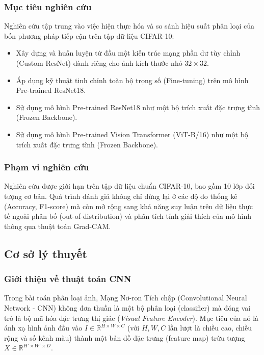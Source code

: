 \documentclass[a4paper]{article}
\theoremstyle{definition}
\begin{document}
\subsubsection{Mục tiêu nghiên cứu}
Nghiên cứu tập trung vào việc hiện thực hóa và so sánh hiệu suất phân loại của bốn phương pháp tiếp cận trên tập dữ liệu CIFAR-10:
\begin{itemize}
	\item Xây dựng và huấn luyện từ đầu một kiến trúc mạng phần dư tùy chỉnh (Custom ResNet) dành riêng cho ảnh kích thước nhỏ $32 \times 32$.
	\item Áp dụng kỹ thuật tinh chỉnh toàn bộ trọng số (Fine-tuning) trên mô hình Pre-trained ResNet18.
	\item Sử dụng mô hình Pre-trained ResNet18 như một bộ trích xuất đặc trưng tĩnh (Frozen Backbone).
	\item Sử dụng mô hình Pre-trained Vision Transformer (ViT-B/16) như một bộ trích xuất đặc trưng tĩnh (Frozen Backbone).
\end{itemize}

\subsubsection{Phạm vi nghiên cứu}
Nghiên cứu được giới hạn trên tập dữ liệu chuẩn CIFAR-10, bao gồm 10 lớp đối tượng cơ bản. Quá trình đánh giá không chỉ dừng lại ở các độ đo thống kê (Accuracy, F1-score) mà còn mở rộng sang khả năng suy luận trên dữ liệu thực tế ngoài phân bố (out-of-distribution) và phân tích tính giải thích của mô hình thông qua thuật toán Grad-CAM.

\subsection{Cơ sở lý thuyết}

\subsubsection{Giới thiệu về thuật toán CNN}\label{sec:dataset}

Trong bài toán phân loại ảnh, Mạng Nơ-ron Tích chập (Convolutional Neural Network - CNN) không đơn thuần là một bộ phân loại (classifier) mà đóng vai trò là bộ mã hóa đặc trưng thị giác (\textit{Visual Feature Encoder}). Mục tiêu của nó là ánh xạ hình ảnh đầu vào $I \in \mathbb{R}^{H \times W \times C}$ (với $H, W, C$ lần lượt là chiều cao, chiều rộng và số kênh màu) thành một bản đồ đặc trưng (feature map) trừu tượng $X \in \mathbb{R}^{H' \times W' \times D}$.
\end{document}
